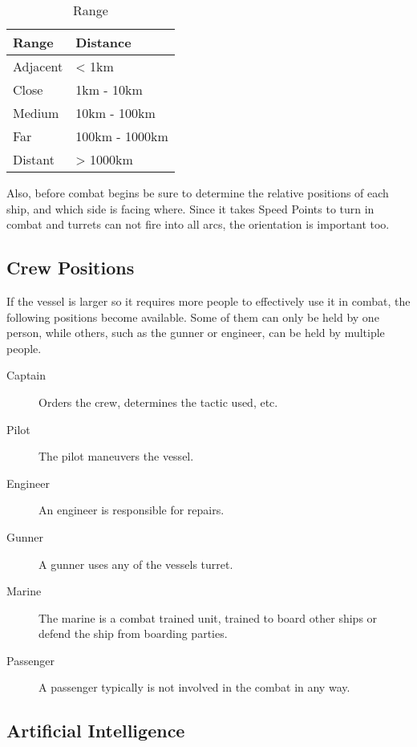 \begin{table}[H]
  \centering
  \caption{Range}
  \label{tab:vessel-range}
  \begin{tabular}{|l|l|}
    \hline
    Range    & Distance       \\ \hline
    Adjacent & < 1km          \\ \hline
    Close    & 1km - 10km     \\ \hline
    Medium   & 10km - 100km   \\ \hline
    Far      & 100km - 1000km \\ \hline
    Distant  & > 1000km       \\ \hline
  \end{tabular}
\end{table}


Also, before combat begins be sure to determine the relative positions of each ship, and which side is facing where. Since it takes Speed Points to turn in combat and turrets can not fire into all arcs, the orientation is important too.

\subsection{Crew Positions}
\label{sub:Vessels-Combat-Setup-Crew-Positions}

If the vessel is larger so it requires more people to effectively use it in combat, the following positions become available. Some of them can only be held by one person, while others, such as the gunner or engineer, can be held by multiple people.

\begin{description}
  \item[Captain] Orders the crew, determines the tactic used, etc.
  \item[Pilot] The pilot maneuvers the vessel.
  \item[Engineer] An engineer is responsible for repairs.
  \item[Gunner] A gunner uses any of the vessels turret.
  \item[Marine] The marine is a combat trained unit, trained to board other ships or defend the ship from boarding parties.
  \item[Passenger] A passenger typically is not involved in the combat in any way.
\end{description}

\subsection{Artificial Intelligence}
\label{sub:Vessels-Combat-Setup-Artificial-Intelligence}

